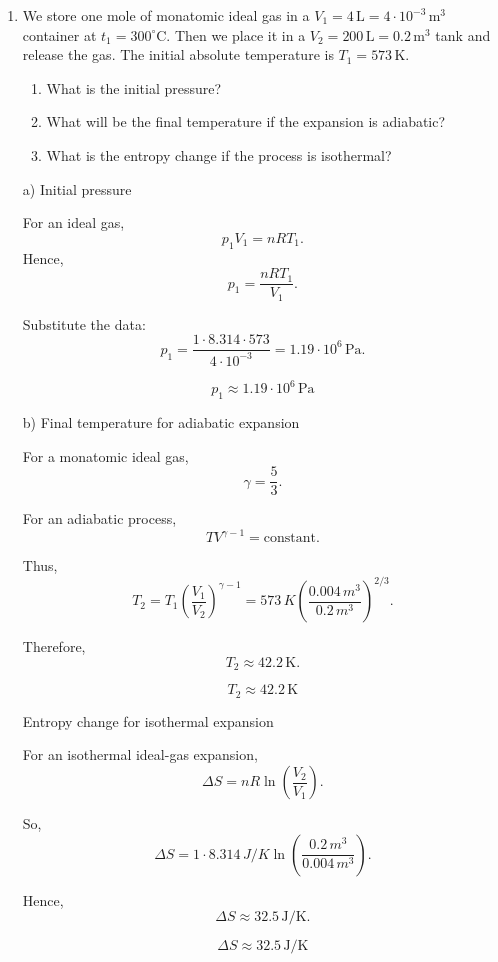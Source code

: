 \documentclass[t,aspectratio=169]{beamer}
\begin{document}
\begin{frame}
\begin{itemize}
\begin{enumerate}
Using
$$ R = 8.314\,\mathrm{J/(mol\,K)}, $$

\pagebreak
we get
$$ \Delta S \approx 5.40\,\mathrm{J/K}. $$

$$ \boxed{\Delta S \approx 5.4\,\mathrm{J/K}}$$


\pagebreak
\item We store one mole of monatomic ideal gas in a $V_1 = 4\,\mathrm{L} = 4\cdot 10^{-3}\,\mathrm{m}^3$ container at $t_1 = 300^\circ\mathrm{C}.$ Then we place it in a $V_2 = 200\,\mathrm{L} = 0.2\,\mathrm{m}^3$ tank and release the gas. The initial absolute temperature is $T_1 = 573\,\mathrm{K}.$
  \begin{enumerate}
  \item[a.)] What is the initial pressure?
\item[b.)] What will be the final temperature if the expansion is adiabatic?
\item[c.)] What is the entropy change if the process is isothermal?
  \end{enumerate}

  
  \bigskip
  
a) Initial pressure

For an ideal gas,
$$p_1 V_1 = nRT_1.$$
Hence, $$ p_1 = \frac{nRT_1}{V_1}.$$

\pagebreak
Substitute the data:
$$ p_1 = \frac{1 \cdot 8.314 \cdot 573}{4\cdot 10^{-3}}= 1.19\cdot 10^6\,\mathrm{Pa}.$$

$$\boxed{p_1 \approx 1.19\cdot 10^6\,\mathrm{Pa}}$$

b) Final temperature for adiabatic expansion

For a monatomic ideal gas,
$$ \gamma = \frac{5}{3}. $$

For an adiabatic process,
$$ TV^{\gamma-1} = \text{constant}. $$

\pagebreak
Thus,
$$ T_2 = T_1 \left(\frac{V_1}{V_2}\right)^{\gamma-1}= 573\,K \left(\frac{0.004\,m^{3}}{0.2\,m^{3}}\right)^{2/3}.$$

Therefore,
$$T_2 \approx 42.2\,\mathrm{K}.$$

$$\boxed{T_2 \approx 42.2\,\mathrm{K}}$$

Entropy change for isothermal expansion

For an isothermal ideal-gas expansion,
$$ \Delta S = nR \ln\!\left(\frac{V_2}{V_1}\right).$$

\pagebreak
So,
$$\Delta S = 1 \cdot 8.314\,J/K \ln\!\left(\frac{0.2\,m^{3}}{0.004\,m^{3}}\right).$$

Hence,
$$\Delta S \approx 32.5\,\mathrm{J/K}.$$

$$\boxed{\Delta S \approx 32.5\,\mathrm{J/K}}$$


\end{enumerate}

\end{itemize}

\end{frame}
\end{document}
